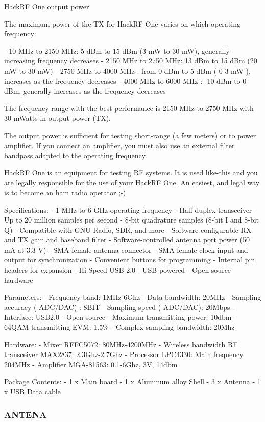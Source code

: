 \documentclass[
  12pt,				%
  openright,			%
  twoside,			%
  a4paper,			%
  english,			%
  french,				%
  spanish,			%
  brazil,				%
  ]{abntex2}
\begin{document}
HackRF One output power

The maximum power of the TX for HackRF One varies on which operating frequency:

- 10 MHz to 2150 MHz: 5 dBm to 15 dBm (3 mW to 30 mW), generally increasing frequency decreases
- 2150 MHz to 2750 MHz: 13 dBm to 15 dBm (20 mW to 30 mW)
- 2750 MHz to 4000 MHz : from 0 dBm to 5 dBm ( 0-3 mW ), increases as the frequency decreases
- 4000 MHz to 6000 MHz : -10 dBm to 0 dBm, generally increases as the frequency decreases

The frequency range with the best performance is 2150 MHz to 2750 MHz with 30 mWatts in output power (TX).

The output power is sufficient for testing short-range (a few meters) or to power amplifier. If you connect an amplifier, you must also use an external filter bandpass adapted to the operating frequency.

HackRF One is an equipment for testing RF systems. It is used like-this and you are legally responsible for the use of your HackRF One. An easiest, and legal way is to become an ham radio operator ;-)


Specifications:
- 1 MHz to 6 GHz operating frequency
- Half-duplex transceiver
- Up to 20 million samples per second
- 8-bit quadrature samples (8-bit I and 8-bit Q)
- Compatible with GNU Radio, SDR, and more
- Software-configurable RX and TX gain and baseband filter
- Software-controlled antenna port power (50 mA at 3.3 V)
- SMA female antenna connector
- SMA female clock input and output for synchronization
- Convenient buttons for programming
- Internal pin headers for expansion
- Hi-Speed USB 2.0
- USB-powered
- Open source hardware

Parameters:
- Frequency band: 1MHz-6Ghz
- Data bandwidth: 20MHz
- Sampling accuracy ( ADC/DAC) : 8BIT
- Sampling speed ( ADC/DAC): 20Mbps
- Interface: USB2.0
- Open source
- Maximum transmitting power: 10dbm
- 64QAM transmitting EVM: 1.5\%
- Complex sampling bandwidth: 20Mhz

Hardware:
- Mixer RFFC5072: 80MHz-4200MHz
- Wireless bandwidth RF transceiver MAX2837: 2.3Ghz-2.7Ghz
- Processor LPC4330: Main frequency 204MHz
- Amplifier MGA-81563: 0.1-6Ghz, 3V, 14dbm

Package Contents:
- 1 x Main board
- 1 x Aluminum alloy Shell
- 3 x Antenna
- 1 x USB Data cable

\subsubsection*{ANTENA}
\end{document}

